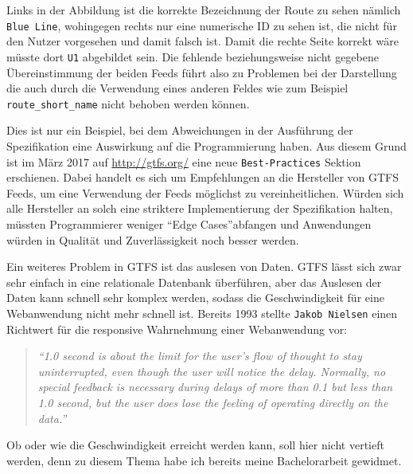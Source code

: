    Links in der Abbildung ist die korrekte Bezeichnung der Route zu sehen nämlich \texttt{Blue Line}, wohingegen rechts nur eine numerische ID zu sehen ist, die nicht für den Nutzer vorgesehen und damit falsch ist. Damit die rechte Seite korrekt wäre müsste dort \texttt{U1} abgebildet sein. Die fehlende beziehungsweise nicht gegebene Übereinstimmung der beiden Feeds führt also zu Problemen bei der Darstellung die auch durch die Verwendung eines anderen Feldes wie zum Beispiel \texttt{route\_short\_name} nicht behoben werden können. 

    Dies ist nur ein Beispiel, bei dem Abweichungen in der Ausführung der Spezifikation eine Auswirkung auf die Programmierung haben. Aus diesem Grund ist im März 2017 auf \url{http://gtfs.org/} eine neue \texttt{Best-Practices} Sektion erschienen. Dabei handelt es sich um Empfehlungen an die Hersteller von GTFS Feeds, um eine Verwendung der Feeds möglichst zu vereinheitlichen. Würden sich alle Hersteller an solch eine striktere Implementierung der Spezifikation halten, müssten Programmierer weniger "`Edge Cases"'\footnotemark abfangen und Anwendungen würden in Qualität und Zuverlässigkeit noch besser werden.\\


    Ein weiteres Problem in GTFS ist das auslesen von Daten. GTFS lässt sich zwar sehr einfach in eine relationale Datenbank überführen, aber das Auslesen der Daten kann schnell sehr komplex werden, sodass die Geschwindigkeit für eine Webanwendung nicht mehr schnell ist. Bereits 1993 stellte \texttt{Jakob Nielsen} einen Richtwert für die responsive Wahrnehmung einer Webanwendung vor:

    \begin{quote}
      \textit{"`1.0 second is about the limit for the user's flow of thought to stay uninterrupted, even though the user will notice the delay. Normally, no special feedback is necessary during delays of more than 0.1 but less than 1.0 second, but the user does lose the feeling of operating directly on the data."'}\parencite{nielsen}
    \end{quote}

    Ob oder wie die Geschwindigkeit erreicht werden kann, soll hier nicht vertieft werden, denn zu diesem Thema habe ich bereits meine Bachelorarbeit gewidmet\parencite{lorer}.

